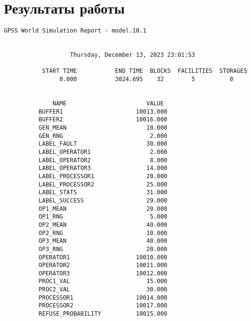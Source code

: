 \section*{Результаты работы}
\begin{lstlisting}[caption={Отчет о работе системы}]
             GPSS World Simulation Report - model.10.1


                   Thursday, December 13, 2023 23:01:53  

           START TIME           END TIME  BLOCKS  FACILITIES  STORAGES
                0.000           3024.695    32        5          0


              NAME                       VALUE  
          BUFFER1                     10013.000
          BUFFER2                     10016.000
          GEN_MEAN                       10.000
          GEN_RNG                         2.000
          LABEL_FAULT                    30.000
          LABEL_OPERATOR1                 2.000
          LABEL_OPERATOR2                 8.000
          LABEL_OPERATOR3                14.000
          LABEL_PROCESSOR1               20.000
          LABEL_PROCESSOR2               25.000
          LABEL_STATS                    31.000
          LABEL_SUCCESS                  29.000
          OP1_MEAN                       20.000
          OP1_RNG                         5.000
          OP2_MEAN                       40.000
          OP2_RNG                        10.000
          OP3_MEAN                       40.000
          OP3_RNG                        20.000
          OPERATOR1                   10010.000
          OPERATOR2                   10011.000
          OPERATOR3                   10012.000
          PROC1_VAL                      15.000
          PROC2_VAL                      30.000
          PROCESSOR1                  10014.000
          PROCESSOR2                  10017.000
          REFUSE_PROBABILITY          10015.000



\end{lstlisting}
